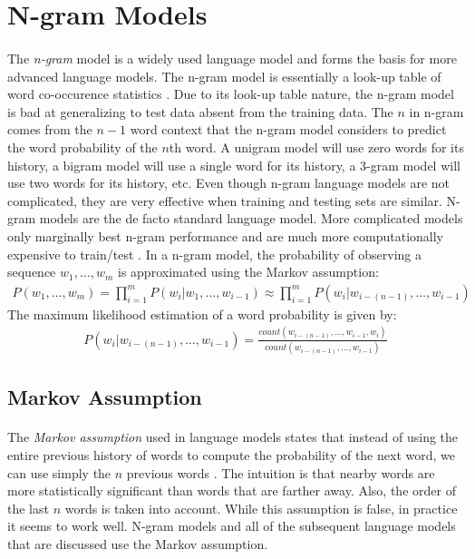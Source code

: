 \section{N-gram Models}
\paragraph{}
The \emph{n-gram} model is a widely used language model and forms the basis for more advanced language models. The n-gram model is essentially a look-up table of word co-occurence statistics \cite{Jurafsky2009}. Due to its look-up table nature, the n-gram model is bad at generalizing to test data absent from the training data. The $n$ in n-gram comes from the $n -1$ word context that the n-gram model considers to predict the word probability of the $n$th word. A unigram model will use zero words for its history, a bigram model will use a single word for its history, a 3-gram model will use two words for its history, etc.  Even though n-gram language models are not complicated, they are very effective when training and testing sets are similar. N-gram models are the de facto standard language model. More complicated models only marginally best n-gram performance and are much more computationally expensive to train/test \cite{Mikolov2012}. 
In a n-gram model, the probability of observing a sequence $w_1, \dots, w_m$ is approximated using the Markov assumption:
\begin{align}
P(w_1,\dots,w_m) = \prod^{m}_{i=1} P(w_i|w_1,\dots, w_{i-1}) \approx  \prod^{m}_{i=1} P(w_i | w_{i-(n-1)},\dots, w_{i-1}) 
\end{align}
The maximum likelihood estimation of a word probability is given by:
\begin{align}
P(w_i | w_{i-(n-1)},\dots, w_{i-1}) = \frac{count(w_{i-(n-1)},\dots,w_{i-1},w_i)}{count(w_{i-(n-1)},\dots,w_{i-1})} 
\end{align}

\subsection{Markov Assumption}
\paragraph{}
The \emph{Markov assumption} used in language models states that instead of using the entire previous history of words to compute the probability of the next word, we can use simply the $n$ previous words \cite{Jurafsky2009}. The intuition is that nearby words are more statistically significant than words that are farther away. Also, the order of the last $n$ words is taken into account. While this assumption is false, in practice it seems to work well. N-gram models and all of the subsequent language models that are discussed use the Markov assumption.
